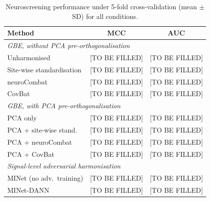 \documentclass[preprint,12pt]{elsarticle}
\begin{document}
\begin{table}[htbp]
  \centering
  \caption{Neuroscreening performance under 5-fold cross-validation
    (mean $\pm$ SD) for all conditions.}
  \label{tab:clinical_cv}
  \begin{tabular}{lcc}
    \toprule
    \textbf{Method} & \textbf{MCC} & \textbf{AUC} \\
    \midrule
    \multicolumn{3}{l}{\textit{GBE, without PCA pre-orthogonalisation}} \\
    \quad Unharmonised               & [TO BE FILLED] & [TO BE FILLED] \\
    \quad Site-wise standardisation  & [TO BE FILLED] & [TO BE FILLED] \\
    \quad neuroCombat                & [TO BE FILLED] & [TO BE FILLED] \\
    \quad CovBat                     & [TO BE FILLED] & [TO BE FILLED] \\
    \midrule
    \multicolumn{3}{l}{\textit{GBE, with PCA pre-orthogonalisation}} \\
    \quad PCA only                   & [TO BE FILLED] & [TO BE FILLED] \\
    \quad PCA + site-wise stand.     & [TO BE FILLED] & [TO BE FILLED] \\
    \quad PCA + neuroCombat          & [TO BE FILLED] & [TO BE FILLED] \\
    \quad PCA + CovBat               & [TO BE FILLED] & [TO BE FILLED] \\
    \midrule
    \multicolumn{3}{l}{\textit{Signal-level adversarial harmonisation}} \\
    \quad MINet (no adv.\ training)  & [TO BE FILLED] & [TO BE FILLED] \\
    \quad MINet-DANN                 & [TO BE FILLED] & [TO BE FILLED] \\
    \bottomrule
  \end{tabular}
\end{table}
\end{document}
